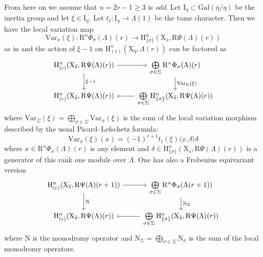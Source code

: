 \documentclass[10pt]{amsart}
\numberwithin{equation}{section}
\theoremstyle{definition}
\def\Gal{\mathrm{Gal}}
\def\rmc{\mathrm{c}}
\def\rmH{\mathrm{H}}
\def\rmI{\mathrm{I}}
\def\rmN{\mathrm{N}}
\def\rmR{\mathrm{R}}
\def\rmX{\mathrm{X}}
\begin{document}
From here on we assume that $n=2r-1\geq 3$ is {\em odd}. Let $\rmI_{\eta}\subset \Gal(\overline{\eta}/\eta)$ be  the inertia group and let $\xi\in \rmI_{\eta}$. Let $t_{\ell}: \rmI_{\eta}\rightarrow\Lambda(1)$ be the tame character. Then we have the local variation map
\begin{equation*}
\mathrm{Var}_{\sigma}(\xi): \rmR^{n}\Phi_{\sigma}(\Lambda)(r)\rightarrow \mathrm{H}^{n}_{\{\sigma\}}(\rmX_{\overline{s}}, \rmR\Psi(\Lambda)(r) )
\end{equation*}
as in \cite[1.4.2]{Illusie-van} and the action of $\xi-1$ on $\rmH^{n}_{(\rmc)}(\rmX_{\overline{\eta}}, \Lambda(r))$ can be factored as 
\begin{equation*}
\begin{tikzcd}
\mathrm{H}^{n}_{(\rmc)}(\rmX_{\overline{s}}, \rmR\Psi(\Lambda)(r)) \arrow[r] \arrow[d, "\xi-1"] & \bigoplus\limits_{\sigma\in\Sigma}\rmR^{n}\Phi_{\sigma}(\Lambda)(r) \arrow[d, "\mathrm{Var}_{\Sigma}(\xi)"]  \\
 \mathrm{H}^{n}_{(\rmc)}(\rmX_{\overline{s}}, \rmR\Psi(\Lambda)(r))    &\bigoplus\limits_{\sigma\in\Sigma}\rmH^{n}_{\{\sigma\}}(\rmX_{\overline{s}}, \rmR\Psi(\Lambda)(r)) \arrow[l]          
\end{tikzcd}
\end{equation*}
where $\mathrm{Var}_{\Sigma}(\xi)=\bigoplus\limits_{\sigma\in\Sigma}\mathrm{Var}_{\sigma}(\xi)$ is the sum of the local variation morphism described by the usual Picard--Lefschetz formula: 
\begin{equation}\label{pic-lef-form}
\mathrm{Var}_{\sigma}(\xi)(x)=(-1)^{r+1}t_{\ell}(\xi)\langle x, \delta\rangle \delta
\end{equation}
where $x\in\rmR^{n}\Phi_{\sigma}(\Lambda)(r)$ is any element and $\delta\in\rmH^{n}_{\{\sigma\}}(\rmX_{\overline{s}}, \rmR\Psi(\Lambda)(r))$ is a generator of this rank one module over $\Lambda$. One has also a Frobenius equivariant version
\begin{equation*}
\begin{tikzcd}
\mathrm{H}^{n}_{(\rmc)}(\rmX_{\overline{s}}, \rmR\Psi(\Lambda)(r+1)) \arrow[r] \arrow[d, "\mathrm{N}"] & \bigoplus\limits_{\sigma\in\Sigma}\rmR^{n}\Phi_{\sigma}(\Lambda(r+1)) \arrow[d, "\mathrm{N}_{\Sigma}"]  \\
\mathrm{H}^{n}_{(\rmc)}(\rmX_{\overline{s}}, \rmR\Psi(\Lambda)(r)) &\bigoplus\limits_{\sigma\in\Sigma}\rmH^{n}_{\{\sigma\}}(\rmX_{\overline{s}}, \rmR\Psi(\Lambda)(r))  \arrow[l]              
\end{tikzcd}          
\end{equation*}
where $\rmN$ is the monodromy operator and $\rmN_{\Sigma}=\bigoplus\limits_{\sigma\in\Sigma}\rmN_{\sigma}$ 
is the sum of the local monodromy operators.
\end{document}
